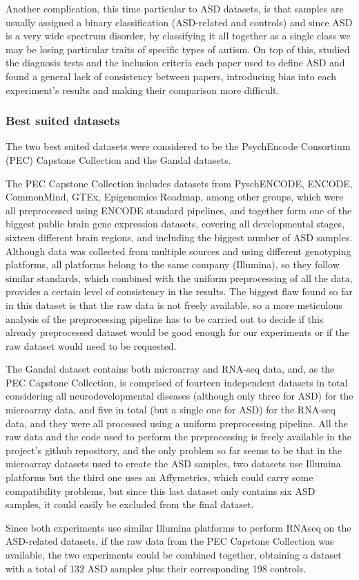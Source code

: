 Another complication, this time particular to ASD datasets, is that samples are usually assigned a binary classification (ASD-related and controls) and since ASD is a very wide spectrum disorder, by classifying it all together as a single class we may be losing particular traits of specific types of autism. On top of this, \cite{ansel_variation_2017} studied the diagnosis tests and the inclusion criteria each paper used to define ASD and found a general lack of consistency between papers, introducing bias into each experiment’s results and making their comparison more difficult.

\subsubsection{Best suited datasets}
The two best suited datasets were considered to be the PsychEncode Consortium (PEC) Capstone Collection \cite{wang_comprehensive_2018} and the Gandal \cite{gandal_shared_2018} datasets.

The PEC Capstone Collection includes datasets from PyschENCODE, ENCODE, CommonMind, GTEx, Epigenomics Roadmap, among other groups, which were all preprocessed using ENCODE standard pipelines, and together form one of the biggest public brain gene expression datasets, covering all developmental stages, sixteen different brain regions, and including the biggest number of ASD samples. Although data was collected from multiple sources and using different genotyping platforms, all platforms belong to the same company (Illumina), so they follow similar standards, which combined with the uniform preprocessing of all the data, provides a certain level of consistency in the results. The biggest flaw found so far in this dataset is that the raw data is not freely available, so a more meticulous analysis of the preprocessing pipeline has to be carried out to decide if this already preprocessed dataset would be good enough for our experiments or if the raw dataset would need to be requested.

The Gandal dataset contains both microarray and RNA-seq data, and, as the PEC Capstone Collection, is comprised of  fourteen independent datasets in total considering all neurodevelopmental diseases (although only three for ASD) for the microarray data, and five in total (but a single one for ASD) for the RNA-seq data, and they were all processed using a uniform preprocessing pipeline. All the raw data and the code used to perform the preprocessing is freely available in the project's github repository, and the only problem so far seems to be that in the microarray datasets used to create the ASD samples, two datasets use Illumina platforms but the third one uses an Affymetrics, which could carry some compatibility problems, but since this last dataset only contains six ASD samples, it could easily be excluded from the final dataset.

Since both experiments use similar Illumina platforms to perform RNAseq on the ASD-related datasets, if the raw data from the PEC Capstone Collection was available, the two experiments could be combined together, obtaining a dataset with a total of 132 ASD samples plus their corresponding 198 controls.


